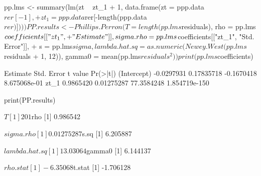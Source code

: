 \documentclass[a4paper]{article}
\begin{document}
\begin{Schunk}
\begin{Sinput}
 pp.lms <- summary(lm(zt ~ zt_1 + 1, data.frame(zt = ppp.data$rer[-1], 
+     zt_1 = ppp.data$rer[-length(ppp.data$rer)])))
 PP.results <- Phillips.Perron(T = length(pp.lms$residuals), rho = pp.lms$coefficients[["zt_1", 
+     "Estimate"]], sigma.rho = pp.lms$coefficients[["zt_1", "Std. Error"]], 
+     s = pp.lms$sigma, lambda.hat.sq = as.numeric(Newey.West(pp.lms$residuals %
+         1, 12)), gamma0 = mean(pp.lms$residuals^2))
 print(pp.lms$coefficients)
\end{Sinput}
\begin{Soutput}
              Estimate Std. Error    t value      Pr(>|t|)
(Intercept) -0.0297931 0.17835718 -0.1670418  8.675068e-01
zt_1         0.9865420 0.01275287 77.3584248 1.854719e-150
\end{Soutput}
\begin{Sinput}
 print(PP.results)
\end{Sinput}
\begin{Soutput}
$T
[1] 201

$rho
[1] 0.986542

$sigma.rho
[1] 0.01275287

$s.sq
[1] 6.205887

$lambda.hat.sq
[1] 13.03064

$gamma0
[1] 6.144137

$rho.stat
[1] -6.35068

$t.stat
[1] -1.706128
\end{Soutput}
\end{Schunk}
\end{document}
